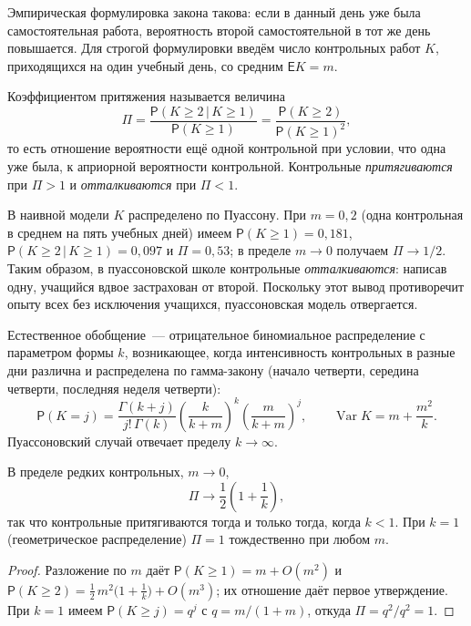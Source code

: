\documentclass[11pt,a4paper]{article}
\begin{document}
Эмпирическая формулировка закона такова: если в данный день уже была самостоятельная работа, вероятность второй самостоятельной в тот же день повышается. Для строгой формулировки введём число контрольных работ $K$, приходящихся на один учебный день, со средним $\mathsf{E}K = m$.

\begin{definition}
Коэффициентом притяжения называется величина
\[
\Pi = \frac{\mathsf{P}(K\ge2\,|\,K\ge1)}{\mathsf{P}(K\ge1)} = \frac{\mathsf{P}(K\ge2)}{\mathsf{P}(K\ge1)^2},
\]
то есть отношение вероятности ещё одной контрольной при условии, что одна уже была, к априорной вероятности контрольной. Контрольные \emph{притягиваются} при $\Pi>1$ и \emph{отталкиваются} при $\Pi<1$.
\end{definition}

В наивной модели $K$ распределено по Пуассону. При $m=0{,}2$ (одна контрольная в среднем на пять учебных дней) имеем $\mathsf{P}(K\ge1)=0{,}181$, $\mathsf{P}(K\ge2\,|\,K\ge1)=0{,}097$ и $\Pi = 0{,}53$; в пределе $m\to0$ получаем $\Pi\to 1/2$. Таким образом, в пуассоновской школе контрольные \emph{отталкиваются}: написав одну, учащийся вдвое застрахован от второй. Поскольку этот вывод противоречит опыту всех без исключения учащихся, пуассоновская модель отвергается.

Естественное обобщение~--- отрицательное биномиальное распределение с параметром формы $k$, возникающее, когда интенсивность контрольных в разные дни различна и распределена по гамма-закону (начало четверти, середина четверти, последняя неделя четверти):
\[
\mathsf{P}(K=j) = \frac{\Gamma(k+j)}{j!\,\Gamma(k)}\left(\frac{k}{k+m}\right)^{k}\left(\frac{m}{k+m}\right)^{j}, \qquad \operatorname{Var}K = m + \frac{m^2}{k}.
\]
Пуассоновский случай отвечает пределу $k\to\infty$.

\begin{theorem}
В пределе редких контрольных, $m\to0$,
\[
\Pi \to \frac{1}{2}\left(1+\frac{1}{k}\right),
\]
так что контрольные притягиваются тогда и только тогда, когда $k<1$. При $k=1$ (геометрическое распределение) $\Pi=1$ тождественно при любом $m$.
\end{theorem}

\begin{proof}
Разложение по $m$ даёт $\mathsf{P}(K\ge1) = m + O(m^2)$ и $\mathsf{P}(K\ge2) = \tfrac12\,m^2\bigl(1+\tfrac1k\bigr) + O(m^3)$; их отношение даёт первое утверждение. При $k=1$ имеем $\mathsf{P}(K\ge j) = q^j$ с $q=m/(1+m)$, откуда $\Pi = q^2/q^2 = 1$.
\end{proof}
\end{document}
